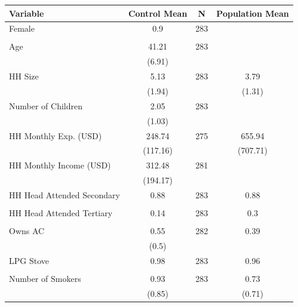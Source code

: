 
\begin{tabular}{lccc}
\toprule
Variable & Control Mean & N & Population Mean\\
\midrule
Female & 0.9 & 283 & \\
 &  &  \vphantom{3} & \\
Age & 41.21 & 283 & \\
 & (6.91) &  & \\
HH Size & 5.13 & 283 & 3.79\\
 & (1.94) &  & (1.31)\\
Number of Children & 2.05 & 283 & \\
 & (1.03) &  & \\
HH Monthly Exp. (USD) & 248.74 & 275 & 655.94\\
 & (117.16) &  & (707.71)\\
HH Monthly Income (USD) & 312.48 & 281 & \\
 & (194.17) &  & \\
HH Head Attended Secondary & 0.88 & 283 & 0.88\\
 &  &  \vphantom{2} & \\
HH Head Attended Tertiary & 0.14 & 283 & 0.3\\
 &  &  \vphantom{1} & \\
Owns AC & 0.55 & 282 & 0.39\\
 & (0.5) &  & \\
LPG Stove & 0.98 & 283 & 0.96\\
 &  &  & \\
Number of Smokers & 0.93 & 283 & 0.73\\
 & (0.85) &  & (0.71)\\
\midrule
\bottomrule
\end{tabular}
